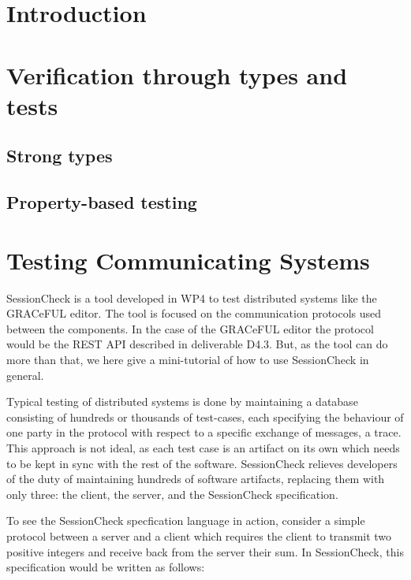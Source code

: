 \documentclass{article}
\begin{document}
\section{Introduction}



\section{Verification through types and tests}

\subsection{Strong types}

\subsection{Property-based testing}


\section{Testing Communicating Systems}
%
SessionCheck \cite{SessionCheck} is a tool developed in WP4 to test distributed systems like
the GRACeFUL editor.
%
The tool is focused on the communication protocols used between the components.
%
In the case of the GRACeFUL editor the protocol would be the REST API described in deliverable D4.3. %
%
But, as the tool can do more than that, we here give a mini-tutorial
of how to use SessionCheck in general.

Typical testing of distributed systems is done by maintaining a database consisting of hundreds
or thousands of test-cases, each specifying the behaviour of one party in the protocol with
respect to a specific exchange of messages, a trace.
%
This approach is not ideal, as each test case is an artifact on its own which needs to be kept
in sync with the rest of the software.
%
SessionCheck relieves developers of the duty of maintaining hundreds of software
artifacts, replacing them with only three: the client, the server, and the SessionCheck specification.

To see the SessionCheck specfication language in action, consider a
simple protocol between a server and a client which requires the
client to transmit two positive integers and receive back from the
server their sum.
%
In SessionCheck, this specification would be written as follows:
%
\end{document}
